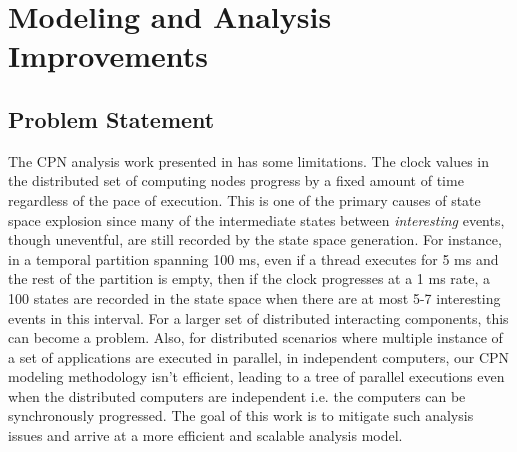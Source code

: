 

\section{Modeling and Analysis Improvements}
\label{sec:Improvements}

\subsection{Problem Statement}

The CPN analysis work presented in \cite{kumar2014colored} has some limitations. The clock values in the distributed set of computing nodes progress by a fixed amount of time regardless of the pace of execution. This is one of the primary causes of state space explosion since many of the intermediate states between \emph{interesting} events, though uneventful, are still recorded by the state space generation. For instance, in a temporal partition spanning 100 ms, even if a thread executes for 5 ms and the rest of the partition is empty, then if the clock progresses at a 1 ms rate, a 100 states are recorded in the state space when there are at most 5-7 interesting events in this interval. For a larger set of distributed interacting components, this can become a problem. Also, for distributed scenarios where multiple instance of a set of applications are executed in parallel, in independent computers, our CPN modeling methodology isn't efficient, leading to a tree of parallel executions even when the distributed computers are independent i.e. the computers can be synchronously progressed. The goal of this work is to mitigate such analysis issues and arrive at a more efficient and scalable analysis model. 


